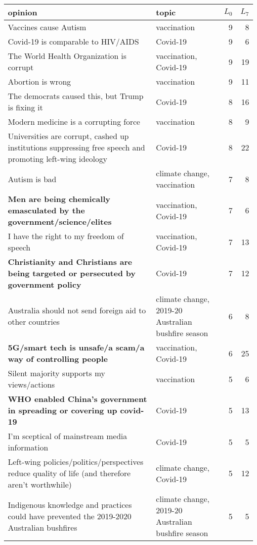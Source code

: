 \begin{table*}
\begin{tabular}{r}
\toprule

\bottomrule
\end{tabular}
\centering
\scriptsize
\begin{tabular}{p{8cm}p{4cm}rr}
\toprule
opinion & topic & $L_0$ & $L_7$\\
\midrule
Vaccines cause Autism & vaccination & 9 & 8\\
Covid-19 is comparable to HIV/AIDS & Covid-19 & 9 & 6\\
The World Health Organization is corrupt & vaccination, Covid-19 & 9 & 19\\
Abortion is wrong & vaccination & 9 & 11\\
The democrats caused this, but Trump is fixing it & Covid-19 & 8 & 16\\
\addlinespace
Modern medicine is a corrupting force & vaccination & 8 & 9\\
Universities are corrupt, cashed up institutions suppressing free speech and promoting left-wing ideology & Covid-19 & 8 & 22\\
Autism is bad & climate change, vaccination & 7 & 8\\
\textbf{Men are being chemically emasculated by the government/science/elites} & vaccination, Covid-19 & 7 & 6\\
I have the right to my freedom of speech & vaccination, Covid-19 & 7 & 13\\
\addlinespace
\textbf{Christianity and Christians are being targeted or persecuted by government policy} & Covid-19 & 7 & 12\\
Australia should not send foreign aid to other countries & climate change, 2019-20 Australian bushfire season & 6 & 8\\
\textbf{5G/smart tech is unsafe/a scam/a way of controlling people} & vaccination, Covid-19 & 6 & 25\\
Silent majority supports my views/actions & vaccination & 5 & 6\\
\textbf{WHO enabled China's government in spreading or covering up covid-19} & Covid-19 & 5 & 13\\
\addlinespace
I'm sceptical of mainstream media information & Covid-19 & 5 & 5\\
Left-wing policies/politics/perspectives reduce quality of life (and therefore aren't worthwhile) & climate change, Covid-19 & 5 & 12\\
Indigenous knowledge and practices could have prevented the 2019-2020 Australian bushfires & climate change, 2019-20 Australian bushfire season & 5 & 5\\

\end{tabular}
\end{table*}
